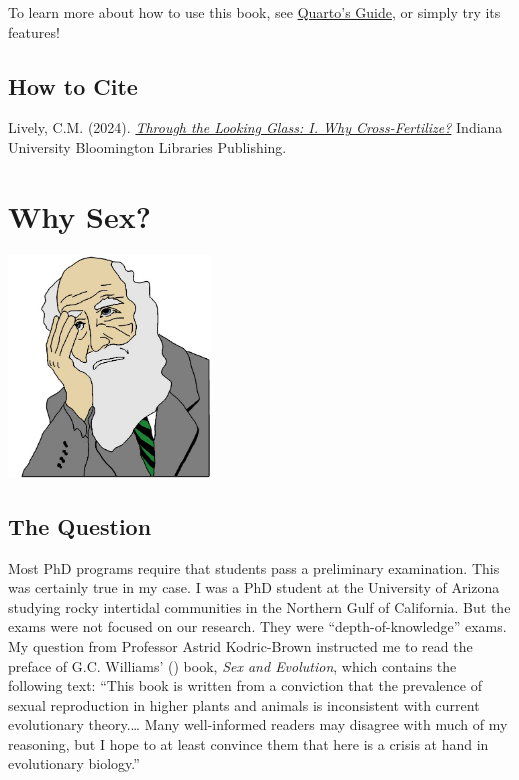 \documentclass[
  letterpaper,
]{book}
\begin{document}
To learn more about how to use this book, see
\href{https://quarto.org/docs/guide/}{Quarto's Guide}, or simply try its
features!

\section*{How to Cite}\label{how-to-cite}


Lively, C.M. (2024).
\href{https://doi.org/10.5967/GBD3-KA07}{\emph{Through the Looking
Glass: I. Why Cross-Fertilize?}} Indiana University Bloomington
Libraries Publishing.


\chapter{Why Sex?}\label{sec-why-sex}

\begin{center}
\includegraphics[width=0.4\textwidth,height=\textheight]{images/fig1-1.jpeg}
\end{center}

\section{The Question}\label{the-question}

Most PhD programs require that students pass a preliminary examination.
This was certainly true in my case. I was a PhD student at the
University of Arizona studying rocky intertidal communities in the
Northern Gulf of California. But the exams were not focused on our
research. They were ``depth-of-knowledge'' exams. My question from
Professor Astrid Kodric-Brown instructed me to read the preface of G.C.
Williams' () book, \emph{Sex and
Evolution}, which contains the following text: ``This book is written
from a conviction that the prevalence of sexual reproduction in higher
plants and animals is inconsistent with current evolutionary
theory.\ldots{} Many well-informed readers may disagree with much of my
reasoning, but I hope to at least convince them that here is a crisis at
hand in evolutionary biology.''
\end{document}
